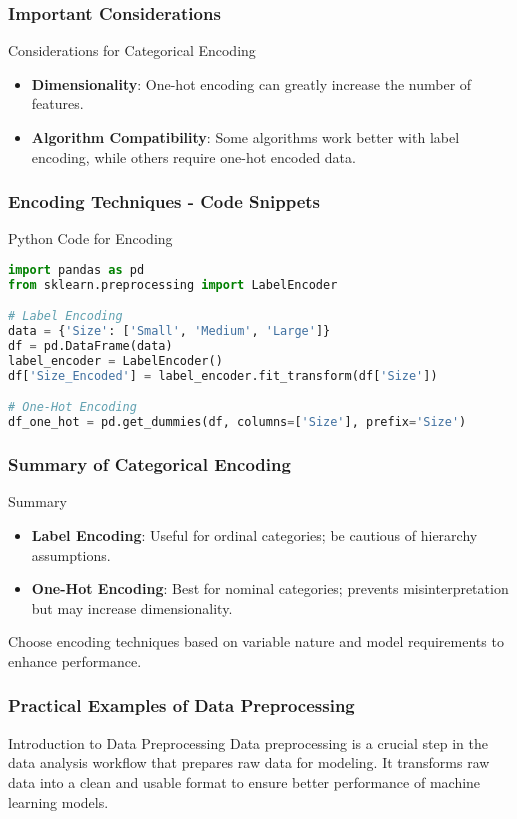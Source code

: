 \documentclass[aspectratio=169]{beamer}
\begin{document}
\begin{frame}[fragile]
  \frametitle{Important Considerations}
  \begin{block}{Considerations for Categorical Encoding}
    \begin{itemize}
        \item \textbf{Dimensionality}: One-hot encoding can greatly increase the number of features.
        \item \textbf{Algorithm Compatibility}: Some algorithms work better with label encoding, while others require one-hot encoded data.
    \end{itemize}
  \end{block}
\end{frame}

\begin{frame}[fragile]
  \frametitle{Encoding Techniques - Code Snippets}
  \begin{block}{Python Code for Encoding}
    \begin{lstlisting}[language=Python]
import pandas as pd
from sklearn.preprocessing import LabelEncoder

# Label Encoding
data = {'Size': ['Small', 'Medium', 'Large']}
df = pd.DataFrame(data)
label_encoder = LabelEncoder()
df['Size_Encoded'] = label_encoder.fit_transform(df['Size'])

# One-Hot Encoding
df_one_hot = pd.get_dummies(df, columns=['Size'], prefix='Size')
    \end{lstlisting}
  \end{block}
\end{frame}

\begin{frame}[fragile]
  \frametitle{Summary of Categorical Encoding}
  \begin{block}{Summary}
    \begin{itemize}
        \item \textbf{Label Encoding}: Useful for ordinal categories; be cautious of hierarchy assumptions.
        \item \textbf{One-Hot Encoding}: Best for nominal categories; prevents misinterpretation but may increase dimensionality.
    \end{itemize}
    Choose encoding techniques based on variable nature and model requirements to enhance performance.
  \end{block}
\end{frame}

\begin{frame}[fragile]
  \frametitle{Practical Examples of Data Preprocessing}
  
  \begin{block}{Introduction to Data Preprocessing}
    Data preprocessing is a crucial step in the data analysis workflow that prepares raw data for modeling. It transforms raw data into a clean and usable format to ensure better performance of machine learning models.
  \end{block}
\end{frame}
\end{document}
